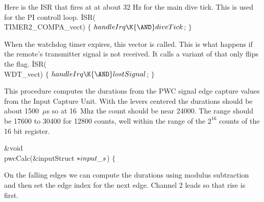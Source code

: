 Here is the ISR that fires at at about 32 Hz for the main dive tick.
This is used for the PI controll loop.
\Y\B\.{ISR}(\\{TIMER2\_COMPA\_vect})\7
${}\{{}$\1\7
${}\\{handleIrq}\K{\AND}\\{diveTick}{}$;\7
\4${}\}{}$\2\Y\par
\fi

When the watchdog timer expires, this vector is called.
This is what happens if the remote's transmitter signal is not received.
It calls a variant of  that only flips the 
flag.
\Y\B\.{ISR}(\\{WDT\_vect})\7
${}\{{}$\1\7
${}\\{handleIrq}\K{\AND}\\{lostSignal}{}$;\7
\4${}\}{}$\2\Y\par
\fi

This procedure computes the durations from the PWC signal edge capture values
from the Input Capture Unit.
With the levers centered the durations should be about 1500~$\mu$s so at
16~Mhz the count should be near 24000.
The range should be 17600 to 30400 for 12800 counts, well within the range
of the $2^{16}$ counts of the 16 bit register.


\Y\B\&{void} \\{pwcCalc}(\&{inputStruct} ${}{*}\\{input\_s}{}$)\1\1\7
$\{{}$\Y\par
\fi

On the falling edges we can compute the durations using modulus subtraction
and then set the edge index for the next edge.
Channel 2 leads so that rise is first.

